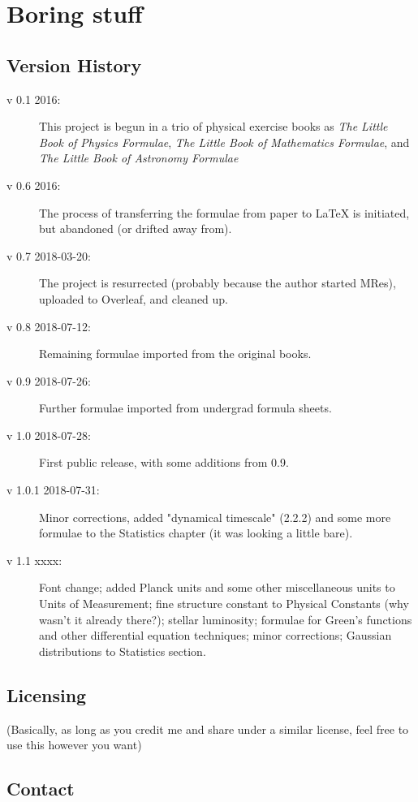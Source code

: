 \chapter{Boring stuff}
\section{Version History}
\begin{description}
\item[v 0.1 2016:] This project is begun in a trio of physical exercise books as \textit{The Little Book of Physics Formulae}, \textit{The Little Book of Mathematics Formulae}, and \textit{The Little Book of Astronomy Formulae}
\item[v 0.6 2016:] The process of transferring the formulae from paper to LaTeX is initiated, but abandoned (or drifted away from).
\item[v 0.7 2018-03-20:] The project is resurrected (probably because the author started MRes), uploaded to Overleaf, and cleaned up.
\item[v 0.8 2018-07-12:] Remaining formulae imported from the original books.
\item[v 0.9 2018-07-26:] Further formulae imported from undergrad formula sheets.
\item[v 1.0 2018-07-28:] First public release, with some additions from 0.9.
\item[v 1.0.1 2018-07-31:] Minor corrections, added "dynamical timescale" (2.2.2) and some more formulae to the Statistics chapter (it was looking a little bare).
\item[v 1.1 xxxx:] Font change; added Planck units and some other miscellaneous units to Units of Measurement; fine structure constant to Physical Constants (why wasn't it already there?); stellar luminosity; formulae for Green's functions and other differential equation techniques; minor corrections; Gaussian distributions to Statistics section.
\end{description}

\section{Licensing}

\doclicenseThis
    
(Basically, as long as you credit me and share under a similar license, feel free to use this however you want)

\section{Contact}
    	
